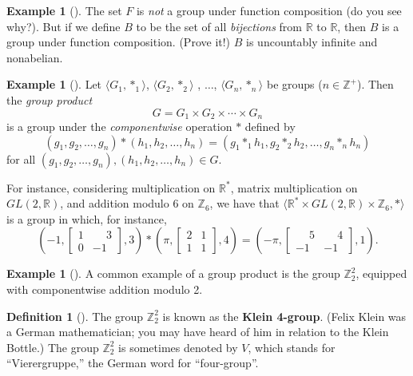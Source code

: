 \documentclass[10pt,openany,oneside]{book}
\newcommand{\terminology}[1]{\textbf{#1}}
\theoremstyle{plain}
\theoremstyle{definition}
\newtheorem{definition}[theorem]{Definition}
\theoremstyle{definition}
\theoremstyle{definition}
\newtheorem{example}[theorem]{Example}
\theoremstyle{definition}
\numberwithin{equation}{section}
\def\Z{\mathbb{Z}}
\def\R{\mathbb{R}}
\newcommand{\amp}{&}
\begin{document}
\begin{example}[]\label{bijrr}
\label{notation-45}
 The set \(F\) is \emph{not} a group under function composition (do you see why?). But if we define \(B\) to be the set of all \emph{bijections} from \(\R\) to \(\R\), then \(B\) is a group under function composition. (Prove it!) \(B\) is uncountably infinite and nonabelian.%
\end{example}
\begin{example}[]\label{gpprod}
Let \(\langle G_1,*_1\rangle\), \(\langle G_2,*_2\rangle\) , \(\ldots\), \(\langle G_n,*_n\rangle\) be groups (\(n\in \Z^+\)). Then the \emph{group product}%
\begin{equation*}
G=G_1\times G_2\times \cdots \times G_n
\end{equation*}
is a group under the \emph{componentwise} operation \(*\) defined by%
\begin{equation*}
(g_1,g_2,\ldots, g_n)*(h_1,h_2,\ldots,h_n)=(g_1*_1h_1, g_2*_2h_2,\ldots, g_n*_nh_n)
\end{equation*}
for all \((g_1,g_2,\ldots, g_n),(h_1,h_2,\ldots,h_n)\in G\).%
\par
For instance, considering multiplication on \(\R^*\), matrix multiplication on \(GL(2,\R)\), and addition modulo \(6\) on \(\Z_6\), we have that \(\langle \R^*\times GL(2,\R) \times \Z_6,*\rangle\) is a group in which, for instance,%
\begin{equation*}
\left(-1, \begin{bmatrix}
1 \amp  \phantom{-}3 \\
0 \amp  -1
\end{bmatrix},
3\right)
*\left(\pi,
\begin{bmatrix}
2 \amp  1 \\
1 \amp  1
\end{bmatrix},
4\right)=\left(-\pi,
\begin{bmatrix}
\phantom{-}5 \amp  \phantom{-}4 \\
-1 \amp -1
\end{bmatrix}
,1\right).
\end{equation*}
%
\end{example}
\begin{example}[]\label{example-22}
A common example of a group product is the group \(\Z_2^2\), equipped with componentwise addition modulo 2.%
\end{example}
\begin{definition}[{}]\label{definition-29}
The group \(\Z_2^2\) is known as the \terminology{Klein 4-group}. (Felix Klein was a German mathematician; you may have heard of him in relation to the Klein Bottle.) The group \(\Z_2^2\) is sometimes denoted by \(V\), which stands for ``Vierergruppe,'' the German word for ``four-group''.%
\end{definition}
\typeout{************************************************}
\typeout{************************************************}
\end{document}
